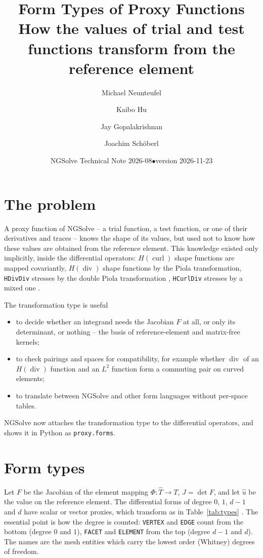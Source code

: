 \documentclass[10pt,a4paper]{article}
\title{\vspace{-1.2cm}Form Types of Proxy Functions\\[2pt]
\large How the values of trial and test functions transform from the reference element}
\author{Michael Neunteufel \and Kaibo Hu \and Jay Gopalakrishnan \and Joachim Sch\"oberl}
\date{NGSolve Technical Note 2026-08\quad$\bullet$\quad version 2026-11-23}
\newcommand{\code}[1]{\texttt{#1}}
\begin{document}
\maketitle\vspace{-1.2cm}

\section{The problem}

A proxy function of NGSolve \cite{s14} -- a trial function, a test function, or one of their derivatives and traces -- knows the shape of its values, but used not to know how these values are obtained from the reference element. This knowledge existed only implicitly, inside the differential operators: $H(\operatorname{curl})$ shape functions are mapped covariantly, $H(\operatorname{div})$ shape functions by the Piola transformation, \code{HDivDiv} stresses by the double Piola transformation \cite{ps11}, \code{HCurlDiv} stresses by a mixed one \cite{gls1}.

The transformation type is useful
\begin{itemize}\setlength\itemsep{1pt}
\item to decide whether an integrand needs the Jacobian $F$ at all, or only its determinant, or nothing -- the basis of reference-element and matrix-free kernels;
\item to check pairings and spaces for compatibility, for example whether $\operatorname{div}$ of an $H(\operatorname{div})$ function and an $L^2$ function form a commuting pair on curved elements;
\item to translate between NGSolve and other form languages without per-space tables.
\end{itemize}
NGSolve now attaches the transformation type to the differential operators, and shows it in Python as \code{proxy.forms}.

\section{Form types}

Let $F$ be the Jacobian of the element mapping $\Phi : \hat T \to T$, $J = \det F$, and let $\hat u$ be the value on the reference element. The differential forms of degree $0$, $1$, $d-1$ and $d$ have scalar or vector proxies, which transform as in Table~\ref{tab:types} \cite{afw06,bossavit}. The essential point is how the degree is counted: \code{VERTEX} and \code{EDGE} count from the bottom (degree $0$ and $1$), \code{FACET} and \code{ELEMENT} from the top (degree $d-1$ and $d$). The names are the mesh entities which carry the lowest order (Whitney) degrees of freedom.
\end{document}
